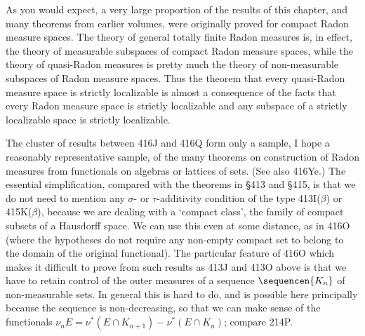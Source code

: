 {As you would expect, a very large proportion of the results of this
chapter, and many theorems from earlier volumes, were originally proved
for compact Radon measure spaces.   The theory of general totally finite
Radon measures is, in effect, the theory of measurable subspaces of
compact Radon
measure spaces, while the theory of quasi-Radon measures is pretty much
the theory of non-measurable subspaces of Radon measure spaces.   Thus
the theorem that
every quasi-Radon measure space is strictly localizable is almost a
consequence of the facts that every Radon measure space is strictly
localizable and any subspace of a strictly localizable space is strictly
localizable.

The cluster of results between 416J and 416Q form only a sample, I hope
a reasonably representative sample, of the many theorems on construction
of Radon measures from functionals on algebras or lattices of sets.
(See also 416Ye.)   The essential simplification,
compared with the theorems in \S413 and \S415, is that we do not need to
mention any $\sigma$- or
$\tau$-additivity condition of the type 413I($\beta$) or 415K($\beta$),
because we are dealing with a `compact class', the family of compact
subsets of a Hausdorff space.   We can use this even at some distance,
as in 416O (where the hypotheses do not require any non-empty compact
set to belong to the domain of the original functional).   The
particular feature of 416O which makes it difficult to prove from such
results as 413J and 413O above is that we have to retain control of the
outer measures of a sequence $\sequencen{K_n}$ of non-measurable sets.
In general this is hard to do, and is possible here principally because
the sequence is non-decreasing, so that we can make sense of the
functionals $\nu_nE=\nu^*(E\cap K_{n+1})-\nu^*(E\cap K_n)$;  compare 214P.
}%

\discrpage


